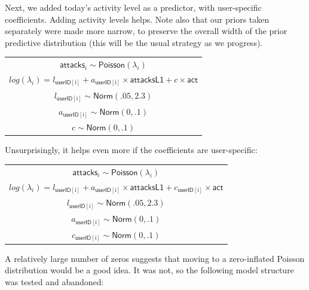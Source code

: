 \documentclass[preprint,12pt]{elsarticle}
\begin{document}
\normalsize

Next, we added today's activity level as a predictor, with user-specific
coefficients. Adding activity levels helps. Note also that our priors
taken separately were made more narrow, to preserve the overall width of
the prior predictive distribution (this will be the usual strategy as we
progress). 


\footnotesize


\begin{center}
\begin{tabular}{c}
$\mathsf{attacks}_i   \sim  \textsf{Poisson}( \lambda_i)$\\ 
$    log(\lambda_i)    =  l_{\mathsf{userID[i]}} + a_{\mathsf{userID[i]}} \times \mathsf{attacksL1} + c \times \mathsf{act}$\\ 
$    l_{\mathsf{userID[i]}}   \sim  \textsf{Norm}(.05,2.3)$\\
$    a_{\mathsf{userID[i]}}   \sim \textsf{Norm}(0,.1)$\\
$    c   \sim  \textsf{Norm}(0,.1)$
\end{tabular}
\end{center}



\normalsize

\noindent Unsurprisingly, it helps even more if the
coefficients are user-specific: 



\footnotesize

\begin{center}
\begin{tabular}{c}
$\mathsf{attacks}_i   \sim  \textsf{Poisson}( \lambda_i)$\\ 
 $   log(\lambda_i)    =  l_{\mathsf{userID[i]}} + a_{\mathsf{userID[i]}} \times  \mathsf{attacksL1} + c_{\mathsf{userID[i]}} \times \mathsf{act}$\\ 
  $  l_{\mathsf{userID[i]}}   \sim  \textsf{Norm}(.05,2.3)$\\
 $   a_{\mathsf{userID[i]}}   \sim \textsf{Norm}(0,.1)$\\
$    c_{\mathsf{userID[i]}}   \sim  \textsf{Norm}(0,.1)$
\end{tabular}
\end{center}


\normalsize

A relatively large number of zeros suggests that moving to a
zero-inflated Poisson distribution would be a good idea. It was not, so
the following model structure was tested and abandoned: 
\end{document}
